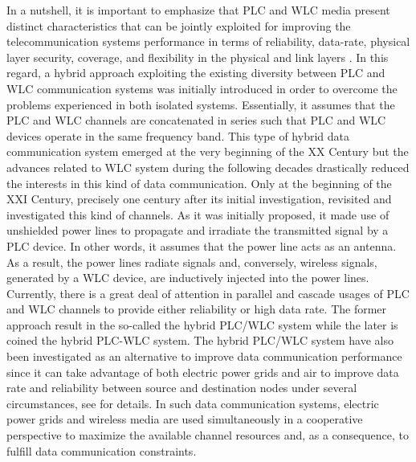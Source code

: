 \documentclass[journal]{IEEEtran}
\begin{document}
%
In a nutshell, it is important to emphasize that \ac{PLC} and \ac{WLC} media present distinct characteristics that can be jointly exploited for improving the telecommunication systems performance in terms of reliability, data-rate, physical layer security, coverage, and flexibility in the physical and link layers \cite{Dib,Victor2017,Sayed2015,Holden2011}. In this regard, a hybrid approach exploiting the existing diversity between \ac{PLC} and \ac{WLC} communication systems was initially introduced in order to overcome the problems experienced in both isolated systems. Essentially, it assumes that the \ac{PLC} and \ac{WLC} channels are concatenated in series such that \ac{PLC} and \ac{WLC} devices operate in the same frequency band. This type of hybrid data communication system emerged at the very beginning of the XX Century \cite{Mischa} but the advances related to \ac{WLC} system during the following decades drastically reduced the interests in this kind of data communication. Only at the beginning of the XXI Century, precisely one century after its initial investigation, \cite{thiago:hyb} revisited and investigated this kind of channels. As it was initially proposed, it made use of unshielded power lines to propagate and irradiate the transmitted signal by a \ac{PLC} device. In other words, it assumes that the power line acts as an antenna. As a result, the power lines radiate signals and, conversely, wireless signals, generated by a \ac{WLC} device, are inductively injected into the power lines. Currently, there is a great deal of attention in parallel and cascade usages of \ac{PLC} and \ac{WLC} channels to provide either reliability or high data rate. The former approach result in the so-called the hybrid \ac{PLC}/\ac{WLC} system while the later is coined the hybrid \ac{PLC}-\ac{WLC} system. The hybrid \ac{PLC}/\ac{WLC} system have also been investigated as an alternative to improve data communication performance \cite{Victor2017,Sayed2014} since it can take advantage of both electric power grids and air to improve data rate and reliability between source and destination nodes under several circumstances, see \cite{Dib} for details. In such data communication systems, electric power grids and wireless media are used simultaneously in a cooperative perspective to maximize the available channel resources and, as a consequence, to fulfill data communication constraints.
\end{document}
